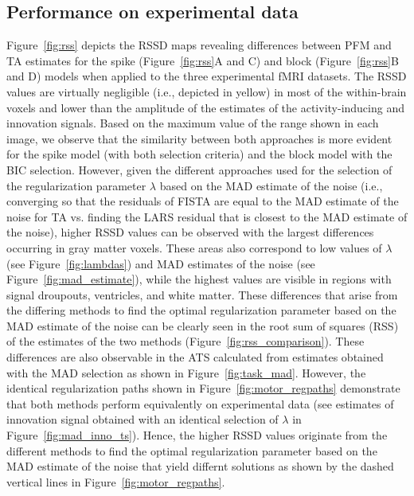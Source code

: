 
\subsection{Performance on experimental data}

Figure~\ref{fig:rss} depicts the RSSD maps revealing differences between PFM and
TA estimates for the spike (Figure~\ref{fig:rss}A and C) and block
(Figure~\ref{fig:rss}B and D) models when applied to the three experimental fMRI
datasets. The RSSD values are virtually negligible (i.e., depicted in yellow) in
most of the within-brain voxels and lower than the amplitude of the estimates of
the activity-inducing and innovation signals. Based on the maximum value of the
range shown in each image, we observe that the similarity between both
approaches is more evident for the spike model (with both selection criteria)
and the block model with the BIC selection. However, given the different
approaches used for the selection of the regularization parameter $\lambda$
based on the MAD estimate of the noise (i.e., converging so that
the residuals of FISTA are equal to the MAD estimate of the noise for TA vs.
finding the LARS residual that is closest to the MAD estimate of the noise),
higher RSSD values can be observed with the largest differences occurring in
gray matter voxels. These areas also correspond to low values of $\lambda$ (see
Figure~\ref{fig:lambdas}) and MAD estimates of the noise (see
Figure~\ref{fig:mad_estimate}), while the highest values are visible in regions
with signal droupouts, ventricles, and white matter. These
differences that arise from the differing methods to find the optimal
regularization parameter based on the MAD estimate of the noise can be clearly
seen in the root sum of squares (RSS) of the estimates of the two methods
(Figure~\ref{fig:rss_comparison}). These differences are also observable in the
ATS calculated from estimates obtained with the MAD selection as shown in
Figure~\ref{fig:task_mad}. However, the identical regularization paths shown in
Figure~\ref{fig:motor_regpaths} demonstrate that both methods perform
equivalently on experimental data (see estimates of innovation signal obtained
with an identical selection of $\lambda$ in Figure~\ref{fig:mad_inno_ts}).
Hence, the higher RSSD values originate from the different methods to find the
optimal regularization parameter based on the MAD estimate of the noise that
yield differnt solutions as shown by the dashed vertical lines in
Figure~\ref{fig:motor_regpaths}.

